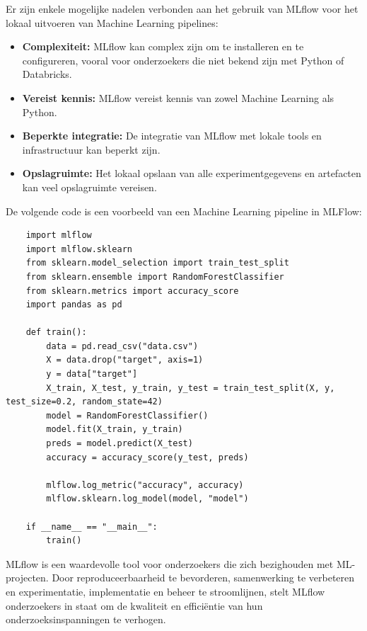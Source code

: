 Er zijn enkele mogelijke nadelen verbonden aan het gebruik van MLflow voor het lokaal uitvoeren van Machine Learning pipelines:
\begin{itemize}
    \item \textbf{Complexiteit:} MLflow kan complex zijn om te installeren en te configureren, vooral voor onderzoekers die niet bekend zijn met Python of Databricks.
    \item \textbf{Vereist kennis:} MLflow vereist kennis van zowel Machine Learning als Python.
    \item \textbf{Beperkte integratie:} De integratie van MLflow met lokale tools en infrastructuur kan beperkt zijn.
    \item \textbf{Opslagruimte:} Het lokaal opslaan van alle experimentgegevens en artefacten kan veel opslagruimte vereisen.
\end{itemize}
De volgende code is een voorbeeld van een Machine Learning pipeline in MLFlow: 
\begin{verbatim}
    import mlflow
    import mlflow.sklearn
    from sklearn.model_selection import train_test_split
    from sklearn.ensemble import RandomForestClassifier
    from sklearn.metrics import accuracy_score
    import pandas as pd
    
    def train():
        data = pd.read_csv("data.csv")
        X = data.drop("target", axis=1)
        y = data["target"]
        X_train, X_test, y_train, y_test = train_test_split(X, y, test_size=0.2, random_state=42)
        model = RandomForestClassifier()
        model.fit(X_train, y_train)
        preds = model.predict(X_test)
        accuracy = accuracy_score(y_test, preds)
        
        mlflow.log_metric("accuracy", accuracy)
        mlflow.sklearn.log_model(model, "model")
    
    if __name__ == "__main__":
        train()
\end{verbatim}
MLflow is een waardevolle tool voor onderzoekers die zich bezighouden met ML-projecten. Door reproduceerbaarheid te bevorderen, samenwerking te verbeteren en experimentatie, implementatie en beheer te stroomlijnen, stelt MLflow onderzoekers in staat om de kwaliteit en efficiëntie van hun onderzoeksinspanningen te verhogen.

